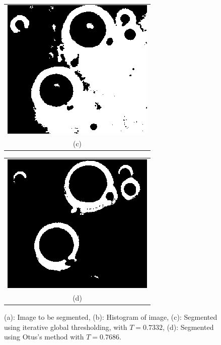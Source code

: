 \begin{figure}[h!]
\begin{minipage}{.45\textwidth}
\end{minipage}
\\
\begin{minipage}{.45\textwidth}
\begin{tabular}{c}
\includegraphics[width=.9\textwidth]{backgroundTheory/segmentation/globalThresholded} \\
(c)
\end{tabular}
\end{minipage}
\begin{minipage}{.45\textwidth}
\begin{tabular}{c}
\includegraphics[width=.9\textwidth]{backgroundTheory/segmentation/otsuThresholded} \\
(d)
\end{tabular}
\end{minipage}
\caption{(a): Image to be segmented, (b): Histogram of image, (c): Segmented using iterative global thresholding, with $T = 0.7332$, (d): Segmented using Otus's method with $T = 0.7686$.}
\label{thresholding}
\end{figure}

